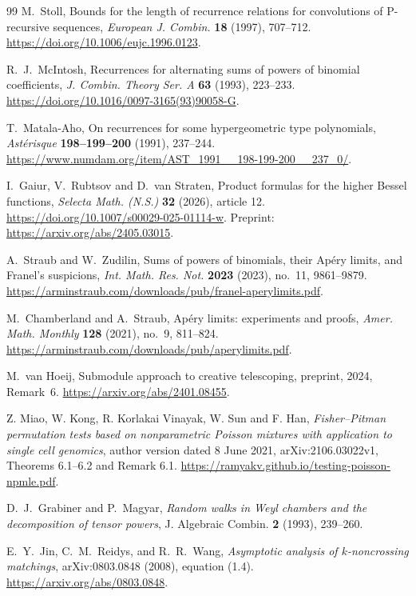 \documentclass[11pt,a4paper]{article}
\theoremstyle{definition}
\theoremstyle{remark}
\numberwithin{equation}{section}
\begin{document}
\begin{thebibliography}{99}
M.~Stoll, Bounds for the length of recurrence relations for
convolutions of P-recursive sequences,
\emph{European J. Combin.} \textbf{18} (1997), 707--712.
\url{https://doi.org/10.1006/eujc.1996.0123}.

R.~J.~McIntosh, Recurrences for alternating sums of powers of
binomial coefficients, \emph{J. Combin. Theory Ser. A}
\textbf{63} (1993), 223--233.
\url{https://doi.org/10.1016/0097-3165(93)90058-G}.

T.~Matala-Aho, On recurrences for some hypergeometric type polynomials,
\emph{Ast\'erisque} \textbf{198--199--200} (1991), 237--244.
\url{https://www.numdam.org/item/AST_1991__198-199-200__237_0/}.

I.~Gaiur, V.~Rubtsov and D.~van Straten, Product formulas for the
higher Bessel functions, \emph{Selecta Math. (N.S.)} \textbf{32}
(2026), article 12. \url{https://doi.org/10.1007/s00029-025-01114-w}.
Preprint: \url{https://arxiv.org/abs/2405.03015}.

A.~Straub and W.~Zudilin, Sums of powers of binomials, their Ap\'ery
limits, and Franel's suspicions, \emph{Int. Math. Res. Not.}
\textbf{2023} (2023), no.~11, 9861--9879.
\url{https://arminstraub.com/downloads/pub/franel-aperylimits.pdf}.

M.~Chamberland and A.~Straub, Ap\'ery limits: experiments and proofs,
\emph{Amer. Math. Monthly} \textbf{128} (2021), no.~9, 811--824.
\url{https://arminstraub.com/downloads/pub/aperylimits.pdf}.

M.~van Hoeij, Submodule approach to creative telescoping,
preprint, 2024, Remark~6.
\url{https://arxiv.org/abs/2401.08455}.

Z. Miao, W. Kong, R. Korlakai Vinayak, W. Sun and F. Han,
\emph{Fisher--Pitman permutation tests based on nonparametric Poisson
mixtures with application to single cell genomics},
author version dated 8 June 2021, arXiv:2106.03022v1,
Theorems 6.1--6.2 and Remark 6.1.
\url{https://ramyakv.github.io/testing-poisson-npmle.pdf}.

D.~J.~Grabiner and P.~Magyar,
\emph{Random walks in Weyl chambers and the decomposition of tensor powers},
J. Algebraic Combin. \textbf{2} (1993), 239--260.

E.~Y.~Jin, C.~M.~Reidys, and R.~R.~Wang,
\emph{Asymptotic analysis of $k$-noncrossing matchings},
arXiv:0803.0848 (2008), equation (1.4).
\url{https://arxiv.org/abs/0803.0848}.


\end{thebibliography}
\end{document}
